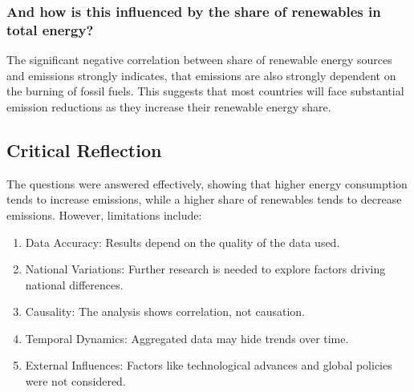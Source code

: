 \documentclass{article}
\begin{document}
\subsubsection*{And how is this influenced by the share of renewables in total energy?}
The significant negative correlation between share of renewable energy sources and emissions strongly indicates, that emissions are also strongly
dependent on the burning of fossil fuels.
This suggests that most countries will face substantial emission reductions as they increase their renewable energy share.

\subsection*{Critical Reflection}
The questions were answered effectively, showing that higher energy consumption tends to increase emissions,
while a higher share of renewables tends to decrease emissions. However, limitations include:
\begin{enumerate}
    \item Data Accuracy: Results depend on the quality of the data used.
    \item National Variations: Further research is needed to explore factors driving national differences.
    \item Causality: The analysis shows correlation, not causation.
    \item Temporal Dynamics: Aggregated data may hide trends over time.
    \item External Influences: Factors like technological advances and global policies were not considered.
\end{enumerate}
\end{document}
